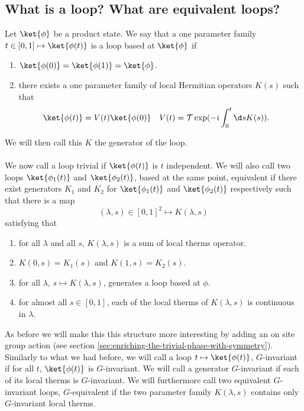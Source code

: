 \subsection{What is a loop? What are equivalent loops?}
Let $\ket{\phi}$ be a product state. We say that a one parameter family $t\in[0,1]\mapsto \ket{\phi(t)}$ is a loop based at $\ket{\phi}$ if
\begin{enumerate}
	\item $\ket{\phi(0)}=\ket{\phi(1)}=\ket{\phi}$.
	\item there exists a one parameter family of local Hermitian operators $K(s)$ such that
	\begin{align}
	\ket{\phi(t)}&=V(t)\ket{\phi(0)}&V(t)&=\mathcal{T}\exp(-i\int_{0}^{t}\d s K(s)).
	\end{align}
\end{enumerate}
We will then call this $K$ the generator of the loop.\\\\
We now call a loop trivial if $\ket{\phi(t)}$ is $t$ independent. We will also call two loops $\ket{\phi_1(t)}$ and $\ket{\phi_2(t)}$, based at the same point, equivalent if there exist generators $K_1$ and $K_2$ for $\ket{\phi_1(t)}$ and $\ket{\phi_2(t)}$ respectively such that there is a map
\begin{equation}
(\lambda,s)\in[0,1]^2\mapsto K(\lambda,s) 
\end{equation}
satisfying that
\begin{enumerate}
	\item for all $\lambda$ and all $s$, $K(\lambda,s)$ is a sum of local therms operator.
	\item $K(0,s)=K_1(s)$ and $K(1,s)=K_2(s)$.
	\item for all $\lambda$, $s\mapsto K(\lambda,s)$, generates a loop based at $\phi$.
	\item for almost all $s\in[0,1]$, each of the local therms of $K(\lambda,s)$ is continuous in $\lambda$.
\end{enumerate}
As before we will make this this structure more interesting by adding an on site group action (see section \ref{sec:enriching-the-trivial-phase-with-symmetry}). Similarly to what we had before, we will call a loop $t\mapsto\ket{\phi(t)}$, $G$-invariant if for all $t$, $\ket{\phi(t)}$ is $G$-invariant. We will call a generator $G$-invariant if each of its local therms is $G$-invariant. We will furthermore call two equivalent $G$-invariant loops, $G$-equivalent if the two parameter family $K(\lambda,s)$ contains only $G$-invariant local therms.\\\\
